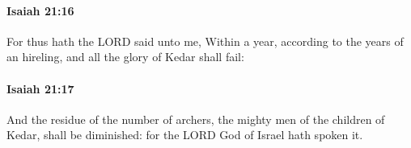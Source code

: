 		\paragraph{Isaiah 21:16} %
			\label{ISAIAH-21-16}

			For thus hath the LORD said unto me, Within a year, according to the years of an hireling, and all the glory of Kedar shall fail:


		\paragraph{Isaiah 21:17} %
			\label{ISAIAH-21-17}

			And the residue of the number of archers, the mighty men of the children of Kedar, shall be diminished: for the LORD God of Israel hath spoken it.

